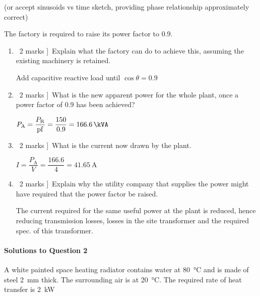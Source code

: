 \documentclass[a4paper,12pt,fleqn]{article}
\begin{document}
\begin{enumerate}[label=\alph*)]
\begin{centering}
\par
\end{centering}
(or accept sinusoids vs time sketch, providing phase relationship approximately correct)
\end{enumerate}
The factory is required to raise its power factor to 0.9. 
\begin{enumerate}[resume,label=\alph*)]

\item \lbrack\ 2 marks ]\ Explain what the factory  can do to achieve this, assuming the existing machinery is retained.\par
Add capacitive reactive load until $\cos\theta=0.9$
\item \lbrack\ 2 marks ]\ What is the new apparent power for the whole plant, once a power factor of 0.9 has been achieved?\par
$P_\mathrm{A}=\dfrac{P_\mathrm{R}}{\mathrm{pf}}=\dfrac{150}{0.9}=\SI{166.6}{\kVA}$
\item \lbrack\ 2 marks ]\ What is the current now drawn by the plant.\par
$I=\dfrac{P_\mathrm{A}}{V}=\dfrac{166.6}{4}=\SI{41.65}{\ampere}$
\item \lbrack\ 2 marks ]\ Explain why the utility company that supplies the power might have required that the power factor be raised.\par
The current required for the same useful power at the plant is reduced, hence reducing transmission losses, losses in the site transformer and the required spec. of this transformer.
\end{enumerate}

\bigskip
\paragraph{\textbf{Solutions to Question 2} \ }

A white painted space heating radiator contains water at \SI{80}{\celsius} and is made of steel \SI{2}{\milli\metre} thick. The surrounding air is at \SI{20}{\celsius}. The required rate of heat transfer is \SI{2}{\kilo\watt}
\end{document}
